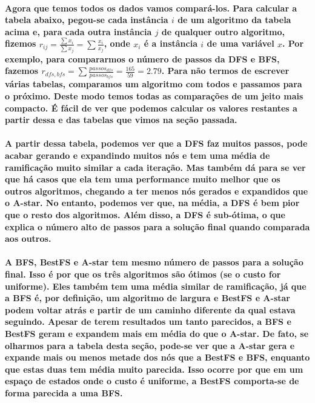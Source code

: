 \documentclass[a4paper,10pt]{article}
\theoremstyle{plain}
\begin{document}
\paragraph{
  Agora que temos todos os dados vamos compará-los. Para calcular a tabela abaixo, pegou-se cada 
instância $i$ de um algoritmo da tabela acima e, para cada outra instância $j$ de qualquer outro 
algoritmo, fizemos $r_{ij} = \frac{\sum x_i}{\sum x_j} = \sum \frac{x_i}{x_j}$, onde $x_i$ é a 
instância $i$ de uma variável $x$. Por exemplo, para compararmos o número de passos da DFS e BFS, 
fazemos $r_{dfs,bfs} = \sum \frac{passos_{dfs}}{passos_{bfs}} = \frac{165}{59} = 2.79$. Para não 
termos de escrever várias tabelas, comparamos um algoritmo com todos e passamos para o próximo. 
Deste modo temos todas as comparações de um jeito mais compacto. É fácil de ver que podemos 
calcular os valores restantes a partir dessa e das tabelas que vimos na seção passada.
}

\paragraph{
  A partir dessa tabela, podemos ver que a DFS faz muitos passos, pode acabar gerando e expandindo
muitos nós e tem uma média de ramificação muito similar a cada iteração. Mas também dá para se
ver que há casos que ela tem uma performance muito melhor que os outros algoritmos, chegando a ter
menos nós gerados e expandidos que o A-star. No entanto, podemos ver que, na média, a DFS é bem
pior que o resto dos algoritmos. Além disso, a DFS é sub-ótima, o que explica o número alto de 
passos para a solução final quando comparada aos outros.
}

\paragraph{
  A BFS, BestFS e A-star tem mesmo número de passos para a solução final. Isso é por que os três
algoritmos são ótimos (se o custo for uniforme). Eles também tem uma média similar de ramificação,
já que a BFS é, por definição, um algoritmo de largura e BestFS e A-star podem voltar atrás e
partir de um caminho diferente da qual estava seguindo. Apesar de terem resultados um tanto
parecidos, a BFS e BestFS geram e expandem mais em média do que o A-star. De fato, se olharmos para
a tabela desta seção, pode-se ver que a A-star gera e expande mais ou menos metade dos nós que a 
BestFS e BFS, enquanto que estas duas tem média muito parecida. Isso ocorre por que em um espaço
de estados onde o custo é uniforme, a BestFS comporta-se de forma parecida a uma BFS.
}
\end{document}
